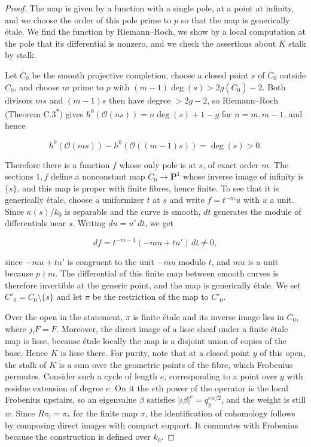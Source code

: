 \documentclass[11pt]{article}
\newcommand{\bpout}[1]{#1\textsuperscript{\hyperlink{bp-outside}{\ensuremath{\ast}}}}
\begin{document}
\begin{proof}[{Proof}]\label{bp42}%
The map is given by a function with a single pole, at a point at infinity, and we choose the order of this pole prime to \(p\) so that the map is generically étale. We find the function by Riemann–Roch, we show by a local computation at the pole that its differential is nonzero, and we check the assertions about \(K\) stalk by stalk.

Let \(\overline C_0\) be the smooth projective completion, choose a closed point \(s\) of \(\overline C_0\) outside \(C_0\), and choose \(m\) prime to \(p\) with \((m-1)\deg(s)>2g(\overline C_0)-2\). Both divisors \(ms\) and \((m-1)s\) then have degree \(>2g-2\), so Riemann–Roch (Theorem \bpout{C.3}) gives \(h^0(\mathcal O(ns))=n\deg(s)+1-g\) for \(n=m,m-1\), and hence

\[
h^0(\mathcal O(ms))-h^0(\mathcal O((m-1)s))=\deg(s)>0.
\]

Therefore there is a function \(f\) whose only pole is at \(s\), of exact order \(m\). The sections \(1,f\) define a nonconstant map \(\overline C_0\to\mathbf P^1\) whose inverse image of infinity is \(\{s\}\), and this map is proper with finite fibres, hence finite. To see that it is generically étale, choose a uniformizer \(t\) at \(s\) and write \(f=t^{-m}u\) with \(u\) a unit. Since \(\kappa(s)/k_0\) is separable and the curve is smooth, \(dt\) generates the module of differentials near \(s\). Writing \(du=u'\,dt\), we get

\[
df=t^{-m-1}(-mu+tu')\,dt\ne0,
\]

since \(-mu+tu'\) is congruent to the unit \(-mu\) modulo \(t\), and \(mu\) is a unit because \(p\nmid m\). The differential of this finite map between smooth curves is therefore invertible at the generic point, and the map is generically étale. We set \(C'_0=\overline C_0\setminus\{s\}\) and let \(\pi\) be the restriction of the map to \(C'_0\).

Over the open in the statement, \(\pi\) is finite étale and its inverse image lies in \(C_0\), where \(j_!F=F\). Moreover, the direct image of a lisse sheaf under a finite étale map is lisse, because étale locally the map is a disjoint union of copies of the base. Hence \(K\) is lisse there. For purity, note that at a closed point \(y\) of this open, the stalk of \(K\) is a sum over the geometric points of the fibre, which Frobenius permutes. Consider such a cycle of length \(e\), corresponding to a point over \(y\) with residue extension of degree \(e\). On it the \(e\)th power of the operator is the local Frobenius upstairs, so an eigenvalue \(\beta\) satisfies \(|\iota\beta|^e=q_y^{ew/2}\), and the weight is still \(w\). Since \(R\pi_!=\pi_*\) for the finite map \(\pi\), the identification of cohomology follows by composing direct images with compact support. It commutes with Frobenius because the construction is defined over \(k_0\).
\end{proof}
\end{document}
